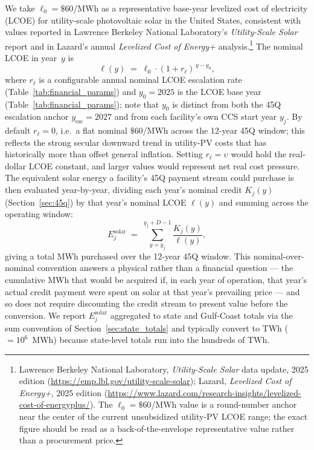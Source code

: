 \documentclass[11pt]{article}
\begin{document}
We take $\ell_0 = \$60$/MWh as a representative base-year levelized cost of electricity (LCOE) for utility-scale photovoltaic solar in the United States, consistent with values reported in Lawrence Berkeley National Laboratory's \emph{Utility-Scale Solar} report and in Lazard's annual \emph{Levelized Cost of Energy+} analysis.\footnote{Lawrence Berkeley National Laboratory, \emph{Utility-Scale Solar} data update, 2025 edition (\url{https://emp.lbl.gov/utility-scale-solar}); Lazard, \emph{Levelized Cost of Energy+}, 2025 edition (\url{https://www.lazard.com/research-insights/levelized-cost-of-energyplus/}). The $\ell_0 = \$60$/MWh value is a round-number anchor near the center of the current unsubsidized utility-PV LCOE range; the exact figure should be read as a back-of-the-envelope representative value rather than a procurement price.} The nominal LCOE in year~$y$ is
%
\begin{equation}
  \ell(y) \;=\; \ell_0 \cdot (1 + r_\ell)^{\, y - y_0},
  \label{eq:lcoe_escalation}
\end{equation}
%
where $r_\ell$ is a configurable annual nominal LCOE escalation rate (Table~\ref{tab:financial_params}) and $y_0 = 2025$ is the LCOE base year (Table~\ref{tab:financial_params}); note that $y_0$ is distinct from both the 45Q escalation anchor $y_{\text{esc}} = 2027$ and from each facility's own CCS start year $y_j$. By default $r_\ell = 0$, i.e.\ a flat nominal $\$60$/MWh across the 12-year 45Q window; this reflects the strong secular downward trend in utility-PV costs that has historically more than offset general inflation. Setting $r_\ell = \upsilon$ would hold the real-dollar LCOE constant, and larger values would represent net real cost pressure. The equivalent solar energy a facility's 45Q payment stream could purchase is then evaluated year-by-year, dividing each year's nominal credit $K_j(y)$ (Section~\ref{sec:45q}) by that year's nominal LCOE $\ell(y)$ and summing across the operating window:
%
\begin{equation}
  E_j^{\text{solar}} \;=\; \sum_{y=y_j}^{y_j+D-1} \frac{K_j(y)}{\ell(y)},
  \label{eq:solar_equiv}
\end{equation}
%
giving a total MWh purchased over the 12-year 45Q window. This nominal-over-nominal convention answers a physical rather than a financial question --- the cumulative MWh that would be acquired if, in each year of operation, that year's actual credit payment were spent on solar at that year's prevailing price --- and so does not require discounting the credit stream to present value before the conversion. We report $E_j^{\text{solar}}$ aggregated to state and Gulf-Coast totals via the sum convention of Section~\ref{sec:state_totals} and typically convert to TWh ($= 10^6$~MWh) because state-level totals run into the hundreds of TWh.
\end{document}
